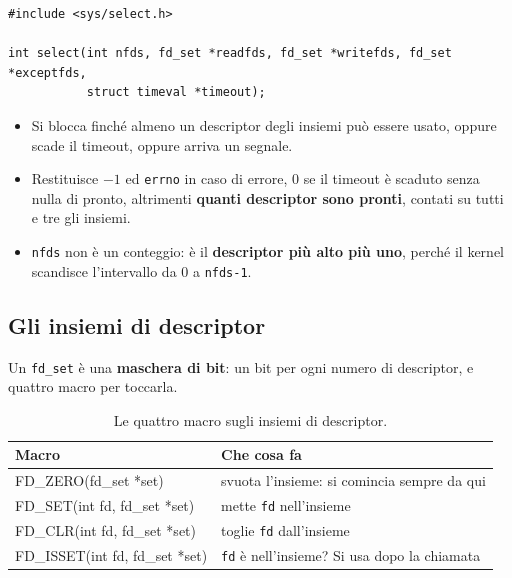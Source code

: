 
\begin{lstlisting}[language={[POSIX]C}, style=wnumbers, title={select}]
#include <sys/select.h>

int select(int nfds, fd_set *readfds, fd_set *writefds, fd_set *exceptfds,
           struct timeval *timeout);
\end{lstlisting}

\begin{itemize}
    \item Si blocca finché almeno un descriptor degli insiemi può essere usato, oppure scade il timeout, oppure arriva un
          segnale.
    \item Restituisce $-1$ ed \texttt{errno} in caso di errore, 0 se il timeout è scaduto senza nulla di pronto, altrimenti
          \textbf{quanti descriptor sono pronti}, contati su tutti e tre gli insiemi.
    \item \texttt{nfds} non è un conteggio: è il \textbf{descriptor più alto più uno}, perché il kernel scandisce
          l'intervallo da 0 a \texttt{nfds-1}.
\end{itemize}

\subsection{Gli insiemi di descriptor}

Un \texttt{fd\_set} è una \textbf{maschera di bit}: un bit per ogni numero di descriptor, e quattro macro per toccarla.

\begin{table}[H]
\centering
\begin{tabular}{>{\ttfamily}l l}
\toprule
\normalfont\textbf{Macro} & \textbf{Che cosa fa} \\
\midrule
FD\_ZERO(fd\_set *set)         & svuota l'insieme: si comincia sempre da qui \\
FD\_SET(int fd, fd\_set *set)   & mette \texttt{fd} nell'insieme \\
FD\_CLR(int fd, fd\_set *set)   & toglie \texttt{fd} dall'insieme \\
FD\_ISSET(int fd, fd\_set *set) & \texttt{fd} è nell'insieme? Si usa dopo la chiamata \\
\bottomrule
\end{tabular}
\caption{Le quattro macro sugli insiemi di descriptor.}
\end{table}


